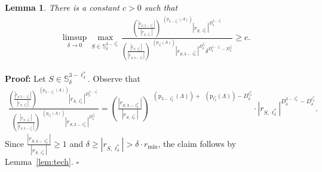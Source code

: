 \documentclass[a4paper, 11pt]{article}
\newenvironment{Proof}{\noindent \textbf{Proof:}}{\hfill$\square$\\}
\DeclareMathOperator{\dB}{\dim_{\mathrm{B}}}
\numberwithin{equation}{section}
\theoremstyle{plain}
\newtheorem{lemma}[theorem]{Lemma}
\theoremstyle{remark}
\theoremstyle{definition}
\begin{document}
\begin{lemma} \label{Lemma:bpv1} There is a constant $c > 0$ such that
\begin{align*}
\limsup_{\delta \to 0} \max_{S \in \mathbb{S}_\delta^{3-\ell_\delta^*}} \frac{\left(\frac{|r_{S,3-\ell_\delta^*}|}{|r_{S,\ell_\delta^*}|}\right)^{\dB(\mathrm{p}_{3-\ell_\delta^*}(\Lambda))}|r_{S,\ell_\delta^*}|^{D_\delta^{3-\ell_\delta^*}}}{\left(\frac{|r_{S,\ell_\delta^*}|}{|r_{S,3-\ell_\delta^*}|}\right)^{\dB(\mathrm{p}_{\ell_\delta^*}(\Lambda))}|r_{S,3-\ell_\delta^*}|^{D_\delta^{\ell_\delta^*}}\delta^{D_\delta^{3-\ell_\delta^*}-D_\delta^{\ell_\delta^*}}} \geq c.
\end{align*}
\end{lemma}
\begin{Proof}
Let $S \in \mathbb{S}_\delta^{3-\ell_\delta^*}$. Observe that
\begin{align*}
 \frac{\left(\frac{|r_{S,3-\ell_\delta^*}|}{|r_{S,\ell_\delta^*}|}\right)^{\dB(\mathrm{p}_{3-\ell_\delta^*}(\Lambda))}|r_{S,\ell_\delta^*}|^{D_\delta^{3-\ell_\delta^*}}}{\left(\frac{|r_{S,\ell_\delta^*}|}{|r_{S,3-\ell_\delta^*}|}\right)^{\dB(\mathrm{p}_{\ell_\delta^*}(\Lambda))}|r_{S,3-\ell_\delta^*}|^{D_\delta^{\ell_\delta^*}}} = \left(\frac{|r_{S,3-\ell_\delta^*}|}{|r_{S,\ell_\delta^*}|}\right)^{\dB(\mathrm{p}_{3-\ell_\delta^*}(\Lambda))+\dB(\mathrm{p}_{\ell_\delta^*}(\Lambda))-D_\delta^{\ell_\delta^*}}
\cdot |r_{S,\ell_\delta^*}|^{D_\delta^{3-\ell_\delta^*}-D_\delta^{\ell_\delta^*}}.
\end{align*}
Since $\frac{|r_{S,3-\ell_\delta^*}|}{|r_{S,\ell_\delta^*}|} \geq 1$ and $\delta \geq |r_{S,\ell_\delta^*}| > \delta \cdot r_{\min}$, the claim follows by Lemma~\ref{lem:tech}.
\end{Proof}
\end{document}
